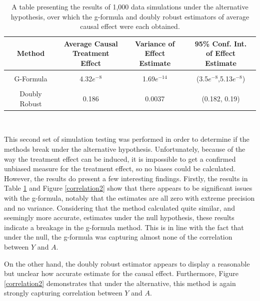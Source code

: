 \begin{table}[h!]
\centering
\begin{tabular}{c | c c c }
Method & \shortstack{Average Causal \\ Treatment Effect} & \shortstack{Variance of \\ Effect Estimate} & \shortstack{95\% Conf. Int.\\ of Effect Estimate} \\ 
\hline \\
G-Formula & 4.32$e^{-8}$ & 1.69$e^{-14}$ &(3.5$e^{-8}$,5.13$e^{-8}$) \\ \\ 
Doubly Robust & 0.186 & 0.0037  & (0.182, 0.19)
\end{tabular} \\
\centering
\caption{A table presenting the results of 1,000 data simulations under the alternative hypothesis, over which the g-formula and doubly robust estimators of average causal effect were each obtained.\label{simdata2}}
\end{table}

This second set of simulation testing was performed in order to determine if the methods break under the alternative hypothesis.  Unfortunately, because of the way the treatment effect can be induced, it is impossible to get a confirmed unbiased measure for the treatment effect, so no biases could be calculated.  However, the results do present a few interesting findings.  Firstly, the results in Table \ref{simdata2} and Figure \ref{correlation2} show that there appears to be significant issues with the g-formula, notably that the estimates are all zero with extreme precision and no variance.  Considering that the method calculated quite similar, and seemingly more accurate, estimates under the null hypothesis, these results indicate a breakage in the g-formula method.  This is in line with the fact that under the null, the g-formula was capturing almost none of the correlation between $Y$ and $A$.  

On the other hand, the doubly robust estimator appears to display a reasonable but unclear how accurate estimate for the causal effect.  Furthermore, Figure \ref{correlation2} demonstrates that under the alternative, this method is again strongly capturing correlation between $Y$ and $A$.  

